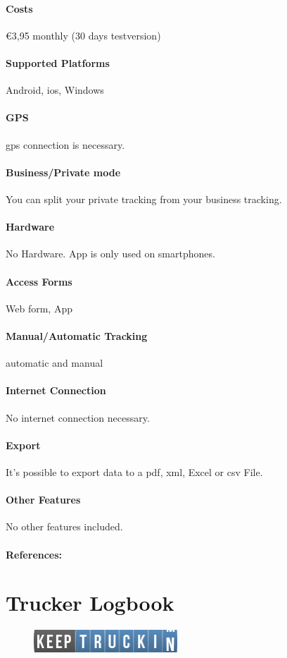 \paragraph{Costs} \euro 3,95 monthly (30 days testversion)
\paragraph{Supported Platforms} Android, \gls{ios}, Windows
\paragraph{GPS} \gls{gps} connection is necessary.
\paragraph{Business/Private mode} You can split your private tracking from your business tracking.
\paragraph{Hardware} No Hardware. App is only used on smartphones.
\paragraph{Access Forms} Web form, App
\paragraph{Manual/Automatic Tracking} automatic and manual
\paragraph{Internet Connection} No internet connection necessary.
\paragraph{Export} It’s possible to export data to a \gls{pdf}, \gls{xml}, Excel or \gls{csv} File.
\paragraph{Other Features} No other features included.
\paragraph{References:} \cite{Fahrtenbuch_Mileage_Book}
\newpage

\section{Trucker Logbook}
\begin{figure}
  \begin{center}
    \includegraphics[width=0.48\textwidth]{bilder/trucker}
  \end{center}
\end{figure}
